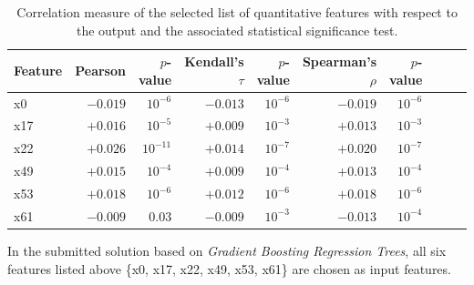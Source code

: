 \documentclass[
11pt, %
a4paper, %
oneside, %
headinclude,footinclude, %
BCOR5mm, %
]{scrartcl}
\begin{document}
\begin{table}[ht!]
	\footnotesize
	\center
	\begin{tabular}{lrrrrrrrrr}  
		\toprule
		Feature & Pearson & $p$-value & Kendall's $\tau$ & $p$-value & Spearman's $\rho$ & $p$-value  \\
		\midrule		
		x0 & 	$-0.019$ & $10^{-6}$	&	$-0.013$ & $10^{-6}$	& $-0.019$	&	$10^{-6}$ \\
		x17 & $+0.016$	& $10^{-5}$	&	$+0.009$ & $10^{-3}$	& $+0.013$	&	$10^{-3}$ \\
		x22 & $+0.026$	& $10^{-11}$	&	$+0.014$ & $10^{-7}$	&	$+0.020$ &	$10^{-7}$ \\
		x49 & $+0.015$	& $10^{-4}$	&	$+0.009$ & $10^{-4}$	& $+0.013$	&	$10^{-4}$ \\
		x53 & $+0.018$	& $10^{-6}$	&	$+0.012$ & $10^{-6}$	& $+0.018$	&	$10^{-6}$ \\
		x61 & $-0.009$	& $0.03$	&	$-0.009$ & $10^{-3}$	& $-0.013$	&	$10^{-4}$ \\
		\bottomrule
	\end{tabular}
	\caption{\label{corr} Correlation measure of the selected list of quantitative features with respect to the output and the associated statistical
	significance test.} 
\end{table}

In the submitted solution based on \textit{Gradient Boosting Regression Trees}, all six features listed above \{x0, x17, x22, x49, x53, x61\} are chosen as input features.
\end{document}
